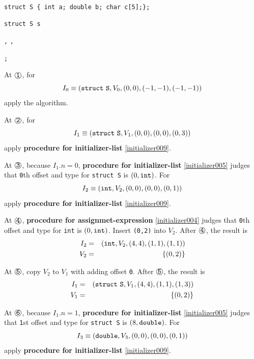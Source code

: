 \begin{Example}

\

{\tt struct S \{ int a; double b; char c[5];\};}

{\tt struct S s }
{\tt {}}

{\tt {}}
{\tt {}}
{\tt {},}
{\tt {}}
{\tt {}}
{\tt {},}
{\tt {}}
{\tt  {}}
{\tt {}}

{\tt {};}

\noindent
At $\MARU{{\tt 1}}$, for
\[
I_0 \equiv ({\tt{struct\,\,S}},V_0,(0,0),(-1,-1),(-1,-1))
\]
apply the algorithm.

\noindent
At $\MARU{{\tt 2}}$, for
\[
I_1 \equiv ({\tt{struct\,\,S}},V_1,(0,0),(0,0),(0,3))
\]
apply {\bf procedure for initializer-list} \ref{initializer009}.

\noindent
At $\MARU{{\tt 3}}$, because $I_1.n = 0$,
{\bf procedure for initializer-list}
\ref{initializer005} judges that
{\tt{0}}th offset and type for {\tt{struct S}} is $(0,{\tt{int}})$.
For
\[
I_2 \equiv ({\tt{int}},V_2,(0,0),(0,0),(0,1))
\]
apply {\bf procedure for initializer-list} \ref{initializer009}.

\noindent
At $\MARU{{\tt 4}}$, {\bf procedure for assignmet-expression}
\ref{initializer004} judges that
{\tt{0}}th offset and type for {\tt{int}} is $(0,{\tt{int}})$.
Insert {\tt (0,2)} into $V_2$.
After $\MARU{{\tt 4}}$, the result is
\begin{eqnarray*}
I_2 & = & ({\tt{int}},V_2,(4,4),(1,1),(1,1)) \\
V_2 & = & \{(0,2)\}
\end{eqnarray*}

\noindent
At $\MARU{\tt 5}$,
copy $V_2$ to $V_1$ with adding offset {\tt 0}.
After $\MARU{{\tt 5}}$, the result is
\begin{eqnarray*}
I_1 & = & ({\tt{struct\,\,S}},V_1,(4,4),(1,1),(1,3)) \\
V_1 & = & \{(0,2)\}
\end{eqnarray*}

\noindent
At $\MARU{{\tt 6}}$, because $I_1.n = 1$,
{\bf procedure for initializer-list} \ref{initializer005} judges that
{\tt{1}}st offset and type for {\tt{struct S}} is $(8,{\tt{double}})$.
For
\[
I_3 \equiv ({\tt{double}},V_3,(0,0),(0,0),(0,1))
\]
apply {\bf procedure for initializer-list} \ref{initializer009}.


\end{Example}

